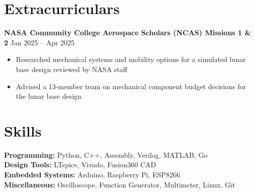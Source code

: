 \documentclass[11pt]{article}       %
\newcommand{\resumeSubheading}[3]{\textbf{#1}{#2} \hfill #3 \\ \vspace{-9pt}}
\newcommand{\resumeItem}[1]{\item #1}
\newcommand{\resumeSubItem}[2]{\textbf{#1:} #2}
\begin{document}
\vspace{-10pt}

\section*{Extracurriculars}
\resumeSubheading{NASA Community College Aerospace Scholars (NCAS) Missions 1 \& 2 }{}{Jan 2025 -- Apr 2025}
\begin{itemize}
  \resumeItem{Researched mechanical systems and mobility options for a simulated lunar base design reviewed by NASA staff}
  \resumeItem{Advised a 13-member team on mechanical component budget decisions for the lunar base design}
\end{itemize}

\vspace{-10pt}

\section*{Skills}
\resumeSubItem{Programming}{Python, C++, Assembly, Verilog, MATLAB, Go} \\
\resumeSubItem{Design Tools}{LTspice, Vivado, Fusion360 CAD} \\
\resumeSubItem{Embedded Systems}{Arduino, Raspberry Pi, ESP8266} \\
\resumeSubItem{Miscellaneous}{Oscilloscope, Function Generator, Multimeter, Linux, Git}
\end{document}
